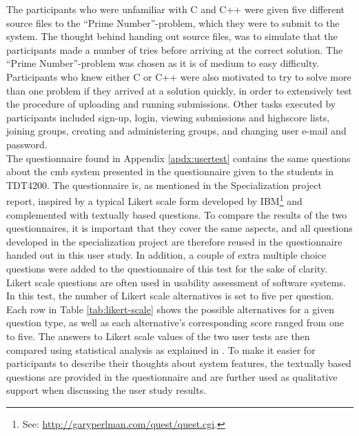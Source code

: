 The participants who were unfamiliar with C and C++ were given five different source files to the ``Prime Number''-problem, which they were to submit to the system. The thought behind handing out source files, was to simulate that the participants made a number of tries before arriving at the correct solution. The ``Prime Number''-problem was chosen as it is of medium to easy difficulty. Participants who knew either C or C++ were also motivated to try to solve more than one problem if they arrived at a solution quickly, in order to extensively test the procedure of uploading and running submissions. Other tasks executed by participants included sign-up, login, viewing submissions and highscore lists, joining groups, creating and administering groups, and changing user e-mail and password. \\

The questionnaire found in Appendix \ref{apdx:usertest} contains the same questions about the \gls{cmb} system presented in the questionnaire given to the students in TDT4200. The questionnaire is, as mentioned in the Specialization project report, inspired by a typical Likert scale form developed by IBM\footnote{See: \url{http://garyperlman.com/quest/quest.cgi}.} and complemented with textually based questions. To compare the results of the two questionnaires, it is important that they cover the same aspects, and all questions developed in the specialization project are therefore reused in the questionnaire handed out in this user study. In addition, a couple of extra multiple choice questions were added to the questionnaire of this test for the sake of clarity. \\

Likert scale questions are often used in usability assessment of software systems. In this test, the number of Likert scale alternatives is set to five per question. Each row in Table \ref{tab:likert-scale} shows the possible alternatives for a given question type, as well as each alternative's corresponding score ranged from one to five. The answers to Likert scale values of the two user tests are then compared using statistical analysis as explained in . To make it easier for participants to describe their thoughts about system features, the textually based questions are provided in the questionnaire and are further used as qualitative support when discussing the user study results.

